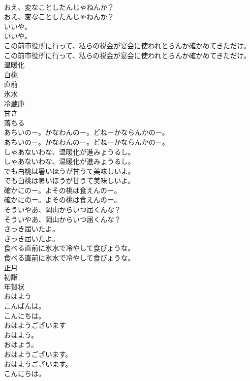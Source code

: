 \documentclass[8pt]{extreport}
\begin{document}
\begin{CJK}{UTF8}{min}
\\	おえ、変なことしたんじゃねんか？	
\\	おえ、変なことしたんじゃねんか？ 
\\	いいや。	
\\	いいや。 
\\	この前市役所に行って、私らの税金が宴会に使われとらんか確かめてきただけ。	
\\	この前市役所に行って、私らの税金が宴会に使われとらんか確かめてきただけ。 
\\	温暖化
\\	白桃
\\	直前
\\	氷水
\\	冷蔵庫
\\	甘さ
\\	落ちる
\\	あちいのー。かなわんのー。どねーかならんかのー。	
\\	あちいのー。かなわんのー。どねーかならんかのー。 
\\	しゃあないわな、温暖化が進みょうるし。	
\\	しゃあないわな、温暖化が進みょうるし。 
\\	でも白桃は暑いほうが甘うて美味しいよ。	
\\	でも白桃は暑いほうが甘うて美味しいよ。 
\\	確かにのー。よその桃は食えんのー。	
\\	確かにのー。よその桃は食えんのー。 
\\	そういやあ、岡山からいつ届くんな？	
\\	そういやあ、岡山からいつ届くんな？ 
\\	さっき届いたよ。	
\\	さっき届いたよ。 
\\	食べる直前に氷水で冷やして食びょうな。	
\\	食べる直前に氷水で冷やして食びょうな。 
\\	正月
\\	初詣
\\	年賀状
\\	おはよう
\\	こんばんは。
\\	こんにちは。
\\	おはようございます
\\	おはよう。	
\\	おはよう。 
\\	おはようございます。	
\\	おはようございます。 
\\	こんにちは。	

\end{CJK}
\end{document}
